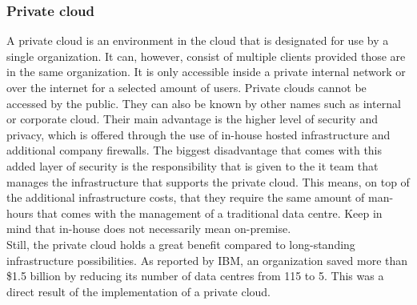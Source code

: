 \subsubsection{Private cloud}
A private cloud is an environment in the cloud that is designated for use by a single organization. 
It can, however, consist of multiple clients provided those are in the same organization. 
It is only accessible inside a private internal network or over the internet for a selected amount of users. 
Private clouds cannot be accessed by the public. 
They can also be known by other names such as internal or corporate cloud. 
Their main advantage is the higher level of security and privacy, which is offered through the use of in-house hosted infrastructure and additional company firewalls. 
The biggest disadvantage that comes with this added layer of security is the responsibility that is given to the \acrshort{it} team that manages the infrastructure that supports the private cloud. 
This means, on top of the additional infrastructure costs, that they require the same amount of man-hours that comes with the management of a traditional data centre. 
Keep in mind that in-house does not necessarily mean on-premise.
\\
Still, the private cloud holds a great benefit compared to long-standing infrastructure possibilities. 
As reported by IBM, an organization saved more than \$1.5 billion by reducing its number of data centres from 115 to 5. 
This was a direct result of the implementation of a private cloud. \autocite{Hofmann2010} 


